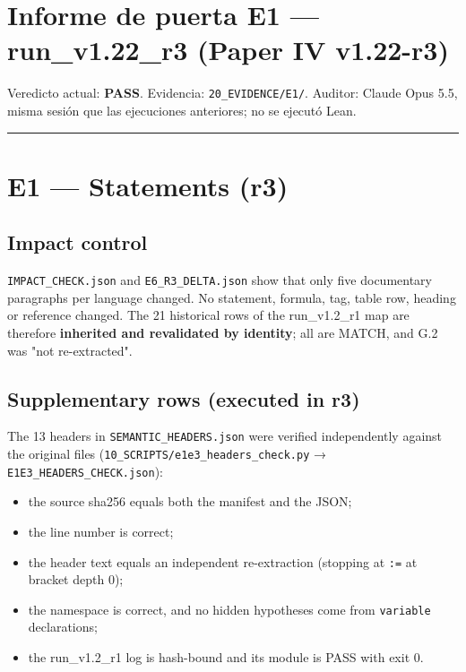 \documentclass[
]{article}
\author{}
\date{}
\providecommand{\tightlist}{%
  \setlength{\itemsep}{0pt}\setlength{\parskip}{0pt}}
\begin{document}
\section{Informe de puerta E1 --- run\_v1.22\_r3 (Paper IV
v1.22-r3)}\label{informe-de-puerta-e1--run_v122_r3-paper-iv-v122-r3}

Veredicto actual: \textbf{PASS}. Evidencia: \texttt{20\_EVIDENCE/E1/}.
Auditor: Claude Opus 5.5, misma sesión que las ejecuciones anteriores;
no se ejecutó Lean.

\begin{center}\rule{0.5\linewidth}{0.5pt}\end{center}

\section{E1 --- Statements (r3)}\label{e1--statements-r3}

\subsection{Impact control}\label{impact-control}

\texttt{IMPACT\_CHECK.json} and \texttt{E6\_R3\_DELTA.json} show that
only five documentary paragraphs per language changed. No statement,
formula, tag, table row, heading or reference changed. The 21 historical
rows of the run\_v1.2\_r1 map are therefore \textbf{inherited and
revalidated by identity}; all are MATCH, and G.2 was "not re-extracted".

\subsection{Supplementary rows (executed in
r3)}\label{supplementary-rows-executed-in-r3}

The 13 headers in \texttt{SEMANTIC\_HEADERS.json} were verified
independently against the original files
(\texttt{10\_SCRIPTS/e1e3\_headers\_check.py} →
\texttt{E1E3\_HEADERS\_CHECK.json}):

\begin{itemize}
\tightlist
\item
  the source sha256 equals both the manifest and the JSON;
\item
  the line number is correct;
\item
  the header text equals an independent re-extraction (stopping at
  \texttt{:=} at bracket depth 0);
\item
  the namespace is correct, and no hidden hypotheses come from
  \texttt{variable} declarations;
\item
  the run\_v1.2\_r1 log is hash-bound and its module is PASS with exit
  0.
\end{itemize}
\end{document}
